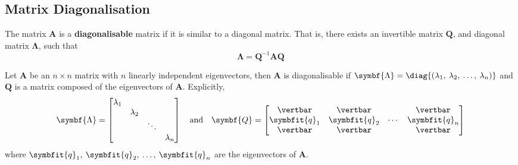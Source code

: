 \documentclass{article}
\begin{document}
\subsection{Matrix Diagonalisation}
\begin{definition}
    The matrix \(\symbf{A}\) is a \textbf{diagonalisable} matrix if it
    is similar to a diagonal matrix. That is, there exists an invertible
    matrix \(\symbf{Q}\), and diagonal matrix \(\symbf{\Lambda}\),
    such that
    \begin{equation*}
        \symbf{\Lambda}=\symbf{Q}^{-1}\symbf{A}\symbf{Q}
    \end{equation*}
\end{definition}
\begin{theorem}
    Let \(\symbf{A}\) be an \(n \times n\) matrix with \(n\) linearly
    independent eigenvectors, then \(\symbf{A}\) is diagonalisable if
    \(\symbf{\Lambda}=\diag{\left( \lambda_1,\: \lambda_2,\: \dots,\: \lambda_n \right)}\)
    and \(\symbf{Q}\) is a matrix composed of the eigenvectors of
    \(\symbf{A}\). Explicitly,
    \begin{equation*}
        \symbf{\Lambda} =
        \begin{bmatrix}
            \lambda_1 &           &        &           \\
                      & \lambda_2 &        &           \\
                      &           & \ddots &           \\
                      &           &        & \lambda_n
        \end{bmatrix}
        \quad
        \text{and}\quad
        \symbf{Q} =
        \begin{bmatrix}
            \vertbar      & \vertbar      &        & \vertbar      \\
            \symbfit{q}_1 & \symbfit{q}_2 & \cdots & \symbfit{q}_n \\
            \vertbar      & \vertbar      &        & \vertbar
        \end{bmatrix}
    \end{equation*}
    where \(\symbfit{q}_1,\: \symbfit{q}_2,\: \dots,\: \symbfit{q}_n\)
    are the eigenvectors of \(\symbf{A}\).
\end{theorem}
\end{document}
